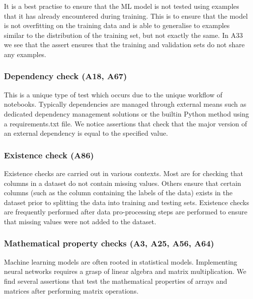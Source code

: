 It is a best practise to ensure that the ML model is not tested using examples that it has already encountered during training. This is to ensure that the model is not overfitting on the training data and is able to generalise to examples similar to the distribution of the training set, but not exactly the same. In A33 we see that the assert ensures that the training and validation sets do not share any examples.

\subsubsection{Dependency check (A18, A67)}

This is a unique type of test which occurs due to the unique workflow of notebooks. Typically dependencies are managed through external means such as dedicated dependency management solutions or the builtin Python method using a requirements.txt file. We notice assertions that check that the major version of an external dependency is equal to the specified value.


\subsubsection{Existence check (A86)}

Existence checks are carried out in various contexts. Most are for checking that columns in a dataset do not contain missing values. Others ensure that certain columns (such as the column containing the labels of the data) exists in the dataset prior to splitting the data into training and testing sets. Existence checks are frequently performed after data pro-processing  steps are performed to ensure that missing values were not added to the dataset.


\subsubsection{Mathematical property checks (A3, A25, A56, A64)}

Machine learning models are often rooted in statistical models. Implementing neural networks requires a grasp of linear algebra and matrix multiplication. We find several assertions that test the mathematical properties of arrays and matrices after performing matrix operations.

